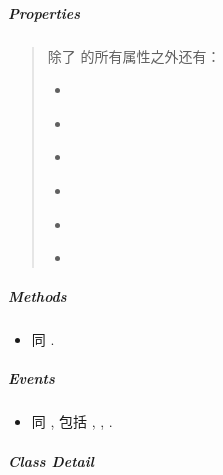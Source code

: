 \documentclass[letterpaper,10pt,english]{sphinxmanual}
\begin{document}
\subparagraph{Properties}
\label{api/component/overlay/dialog:properties}\begin{quote}

除了 {\hyperref[api/component/overlay/popup:module-Overlay]{}} 的所有属性之外还有：
\begin{itemize}
\item {}
{\hyperref[api/component/overlay/dialog:Overlay.header]{}}

\item {}
{\hyperref[api/component/overlay/dialog:Overlay.body]{}}

\item {}
{\hyperref[api/component/overlay/dialog:Overlay.footer]{}}

\item {}
{\hyperref[api/component/overlay/dialog:Overlay.closable]{}}

\item {}
{\hyperref[api/component/overlay/dialog:Overlay.draggable]{}}

\item {}
{\hyperref[api/component/overlay/dialog:Overlay.constrain]{}}

\end{itemize}
\end{quote}


\subparagraph{Methods}
\label{api/component/overlay/dialog:methods}\begin{itemize}
\item {}
同 {\hyperref[api/component/overlay/popup:module-Overlay]{}} .

\end{itemize}


\subparagraph{Events}
\label{api/component/overlay/dialog:events}\begin{itemize}
\item {}
同 {\hyperref[api/component/overlay/popup:module-Overlay]{}} , 包括 {\hyperref[api/component/overlay/overlay:Overlay.show]{}} , {\hyperref[api/component/overlay/overlay:Overlay.hide]{}} , {\hyperref[api/component/overlay/overlay:Overlay.beforeVisibleChange]{}} .

\end{itemize}


\subparagraph{Class Detail}
\label{api/component/overlay/dialog:class-detail}
\end{document}
